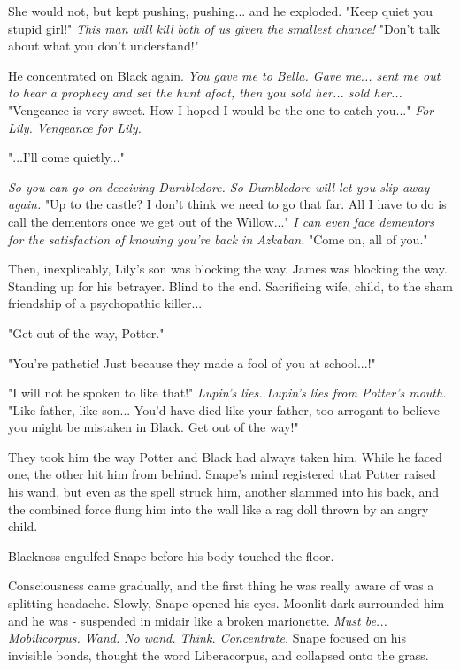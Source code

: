 She would not, but kept pushing, pushing... and he exploded. "Keep quiet you stupid girl!" \emph{This man will kill both of us given the smallest chance!} "Don't talk about what you don't understand!"

He concentrated on Black again. \emph{You gave me to Bella. Gave me... sent me out to hear a prophecy and set the hunt afoot, then you sold her... sold her...} "Vengeance is very sweet. How I hoped I would be the one to catch you..." \emph{For Lily. Vengeance for Lily.}

"...I'll come quietly..."

\emph{So you can go on deceiving Dumbledore. So Dumbledore will let you slip away again. }"Up to the castle? I don't think we need to go that far. All I have to do is call the dementors once we get out of the Willow..." \emph{I can even face dementors for the satisfaction of knowing you're back in Azkaban.} "Come on, all of you."

Then, inexplicably, Lily's son was blocking the way. James was blocking the way. Standing up for his betrayer. Blind to the end. Sacrificing wife, child, to the sham friendship of a psychopathic killer...

"Get out of the way, Potter."

"You're pathetic! Just because they made a fool of you at school...!"

"I will not be spoken to like that!" \emph{Lupin's lies. Lupin's lies from Potter's mouth.} "Like father, like son... You'd have died like your father, too arrogant to believe you might be mistaken in Black. Get out of the way!"

They took him the way Potter and Black had always taken him. While he faced one, the other hit him from behind. Snape's mind registered that Potter raised his wand, but even as the spell struck him, another slammed into his back, and the combined force flung him into the wall like a rag doll thrown by an angry child.

Blackness engulfed Snape before his body touched the floor.

\sbreak

Consciousness came gradually, and the first thing he was really aware of was a splitting headache. Slowly, Snape opened his eyes. Moonlit dark surrounded him and he was - suspended in midair like a broken marionette. \emph{Must be... Mobilicorpus. Wand. No wand. Think. Concentrate.} Snape focused on his invisible bonds, thought the word Liberacorpus, and collapsed onto the grass.

